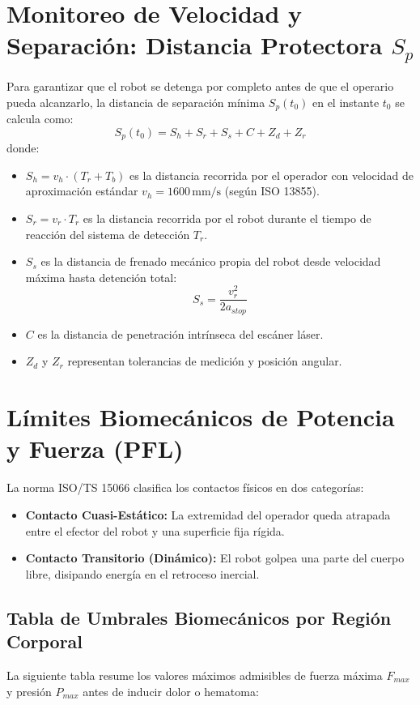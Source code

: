 \documentclass[11pt,a4paper]{article}
\begin{document}
\section{Monitoreo de Velocidad y Separación: Distancia Protectora $S_p$}
Para garantizar que el robot se detenga por completo antes de que el operario pueda alcanzarlo, la distancia de separación mínima $S_p(t_0)$ en el instante $t_0$ se calcula como:
\begin{equation}
S_p(t_0) = S_h + S_r + S_s + C + Z_d + Z_r
\end{equation}
donde:
\begin{itemize}
    \item $S_h = v_h \cdot (T_r + T_b)$ es la distancia recorrida por el operador con velocidad de aproximación estándar $v_h = 1600\,\text{mm/s}$ (según ISO 13855).
    \item $S_r = v_r \cdot T_r$ es la distancia recorrida por el robot durante el tiempo de reacción del sistema de detección $T_r$.
    \item $S_s$ es la distancia de frenado mecánico propia del robot desde velocidad máxima hasta detención total:
    \begin{equation}
    S_s = \frac{v_r^2}{2 a_{stop}}
    \end{equation}
    \item $C$ es la distancia de penetración intrínseca del escáner láser.
    \item $Z_d$ y $Z_r$ representan tolerancias de medición y posición angular.
\end{itemize}

\section{Límites Biomecánicos de Potencia y Fuerza (PFL)}
La norma ISO/TS 15066 clasifica los contactos físicos en dos categorías:
\begin{itemize}
    \item \textbf{Contacto Cuasi-Estático:} La extremidad del operador queda atrapada entre el efector del robot y una superficie fija rígida.
    \item \textbf{Contacto Transitorio (Dinámico):} El robot golpea una parte del cuerpo libre, disipando energía en el retroceso inercial.
\end{itemize}

\subsection{Tabla de Umbrales Biomecánicos por Región Corporal}
La siguiente tabla resume los valores máximos admisibles de fuerza máxima $F_{max}$ y presión $P_{max}$ antes de inducir dolor o hematoma:
\end{document}
